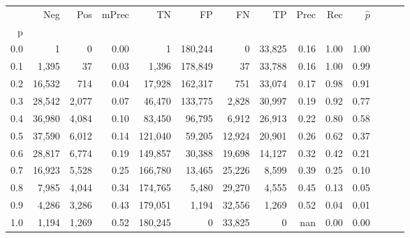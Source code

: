\begin{tabular}{rrrrrrrrrrrrrr}
\toprule
{} &     Neg &    Pos & mPrec &       TN &       FP &      FN &      TP &  Prec &   Rec & $\hat{p}$ \\
p   &         &        &       &          &          &         &         &       &       &           \\
\midrule
0.0 &       1 &      0 &  0.00 &        1 &  180,244 &       0 &  33,825 &  0.16 &  1.00 &      1.00 \\
0.1 &   1,395 &     37 &  0.03 &    1,396 &  178,849 &      37 &  33,788 &  0.16 &  1.00 &      0.99 \\
0.2 &  16,532 &    714 &  0.04 &   17,928 &  162,317 &     751 &  33,074 &  0.17 &  0.98 &      0.91 \\
0.3 &  28,542 &  2,077 &  0.07 &   46,470 &  133,775 &   2,828 &  30,997 &  0.19 &  0.92 &      0.77 \\
0.4 &  36,980 &  4,084 &  0.10 &   83,450 &   96,795 &   6,912 &  26,913 &  0.22 &  0.80 &      0.58 \\
0.5 &  37,590 &  6,012 &  0.14 &  121,040 &   59,205 &  12,924 &  20,901 &  0.26 &  0.62 &      0.37 \\
0.6 &  28,817 &  6,774 &  0.19 &  149,857 &   30,388 &  19,698 &  14,127 &  0.32 &  0.42 &      0.21 \\
0.7 &  16,923 &  5,528 &  0.25 &  166,780 &   13,465 &  25,226 &   8,599 &  0.39 &  0.25 &      0.10 \\
0.8 &   7,985 &  4,044 &  0.34 &  174,765 &    5,480 &  29,270 &   4,555 &  0.45 &  0.13 &      0.05 \\
0.9 &   4,286 &  3,286 &  0.43 &  179,051 &    1,194 &  32,556 &   1,269 &  0.52 &  0.04 &      0.01 \\
1.0 &   1,194 &  1,269 &  0.52 &  180,245 &        0 &  33,825 &       0 &   nan &  0.00 &      0.00 \\
\bottomrule
\end{tabular}
